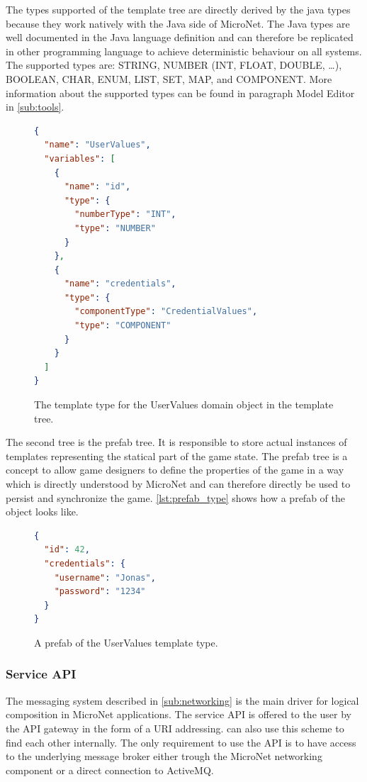 The types supported of the template tree are directly derived by the java types
because they work natively with the Java side of MicroNet. The Java types are
well documented in the Java language definition and can therefore be replicated
in other programming language to achieve deterministic behaviour on all systems.
The supported types are: STRING, NUMBER (INT, FLOAT, DOUBLE, \ldots), BOOLEAN, CHAR,
ENUM, LIST, SET, MAP, and COMPONENT. More information about the supported types
can be found in paragraph Model Editor in \autoref{sub:tools}.

\begin{figure}
\begin{lstlisting}[language=json,firstnumber=1] 
{
  "name": "UserValues",
  "variables": [
    {
      "name": "id",
      "type": {
        "numberType": "INT",
        "type": "NUMBER"
      }
    },
    {
      "name": "credentials",
      "type": {
        "componentType": "CredentialValues",
        "type": "COMPONENT"
      }
    }
  ]
}
\end{lstlisting}
\caption{The template type for the UserValues domain object in the template
tree.}
\label{lst:template_type}
\end{figure}

The second tree is the prefab tree. It is responsible to store actual instances
of templates representing the statical part of the game state. The prefab tree
is a concept to allow game designers to define the properties of the game in a
way which is directly understood by MicroNet and can therefore directly be used
to persist and synchronize the game. \autoref{lst:prefab_type} shows how a
prefab of the  object looks like.

\begin{figure}
\begin{lstlisting}[language=json,firstnumber=1] 
{
  "id": 42,
  "credentials": {
    "username": "Jonas",
    "password": "1234"
  }
}
\end{lstlisting}
\caption{A prefab of the UserValues template type.}
\label{lst:prefab_type}
\end{figure}



\subsubsection{Service API}

The messaging system described in \autoref{sub:networking} is the main driver
for logical composition in MicroNet applications. The service API is offered to
the user by the API gateway in the form of a URI addressing. \mss{} can also use
this scheme to find each other internally. The only requirement to use the API
is to have access to the underlying message broker either trough the MicroNet
networking component or a direct connection to ActiveMQ.

